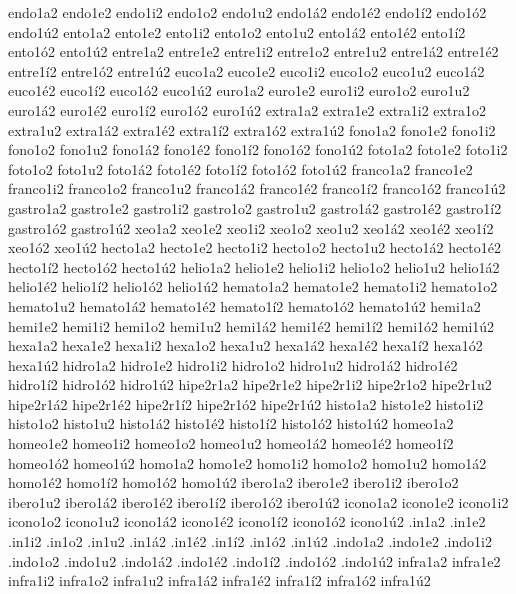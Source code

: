 {{endo1a2 endo1e2 endo1i2 endo1o2 endo1u2 endo1^^e12 endo1^^e92 endo1^^ed2 endo1^^f32 endo1^^fa2 
ento1a2 ento1e2 ento1i2 ento1o2 ento1u2 ento1^^e12 ento1^^e92 ento1^^ed2 ento1^^f32 ento1^^fa2 
entre1a2 entre1e2 entre1i2 entre1o2 entre1u2 entre1^^e12 entre1^^e92 entre1^^ed2 entre1^^f32 entre1^^fa2 
euco1a2 euco1e2 euco1i2 euco1o2 euco1u2 euco1^^e12 euco1^^e92 euco1^^ed2 euco1^^f32 euco1^^fa2 
euro1a2 euro1e2 euro1i2 euro1o2 euro1u2 euro1^^e12 euro1^^e92 euro1^^ed2 euro1^^f32 euro1^^fa2 
extra1a2 extra1e2 extra1i2 extra1o2 extra1u2 extra1^^e12 extra1^^e92 extra1^^ed2 extra1^^f32 extra1^^fa2 
fono1a2 fono1e2 fono1i2 fono1o2 fono1u2 fono1^^e12 fono1^^e92 fono1^^ed2 fono1^^f32 fono1^^fa2 
foto1a2 foto1e2 foto1i2 foto1o2 foto1u2 foto1^^e12 foto1^^e92 foto1^^ed2 foto1^^f32 foto1^^fa2 
franco1a2 franco1e2 franco1i2 franco1o2 franco1u2 franco1^^e12 franco1^^e92 franco1^^ed2 franco1^^f32 franco1^^fa2 
gastro1a2 gastro1e2 gastro1i2 gastro1o2 gastro1u2 gastro1^^e12 gastro1^^e92 gastro1^^ed2 gastro1^^f32 gastro1^^fa2 
xeo1a2 xeo1e2 xeo1i2 xeo1o2 xeo1u2 xeo1^^e12 xeo1^^e92 xeo1^^ed2 xeo1^^f32 xeo1^^fa2 
hecto1a2 hecto1e2 hecto1i2 hecto1o2 hecto1u2 hecto1^^e12 hecto1^^e92 hecto1^^ed2 hecto1^^f32 hecto1^^fa2 
helio1a2 helio1e2 helio1i2 helio1o2 helio1u2 helio1^^e12 helio1^^e92 helio1^^ed2 helio1^^f32 helio1^^fa2 
hemato1a2 hemato1e2 hemato1i2 hemato1o2 hemato1u2 hemato1^^e12 hemato1^^e92 hemato1^^ed2 hemato1^^f32 hemato1^^fa2 
hemi1a2 hemi1e2 hemi1i2 hemi1o2 hemi1u2 hemi1^^e12 hemi1^^e92 hemi1^^ed2 hemi1^^f32 hemi1^^fa2 
hexa1a2 hexa1e2 hexa1i2 hexa1o2 hexa1u2 hexa1^^e12 hexa1^^e92 hexa1^^ed2 hexa1^^f32 hexa1^^fa2 
hidro1a2 hidro1e2 hidro1i2 hidro1o2 hidro1u2 hidro1^^e12 hidro1^^e92 hidro1^^ed2 hidro1^^f32 hidro1^^fa2 
hipe2r1a2 hipe2r1e2 hipe2r1i2 hipe2r1o2 hipe2r1u2 hipe2r1^^e12 hipe2r1^^e92 hipe2r1^^ed2 hipe2r1^^f32 hipe2r1^^fa2 
histo1a2 histo1e2 histo1i2 histo1o2 histo1u2 histo1^^e12 histo1^^e92 histo1^^ed2 histo1^^f32 histo1^^fa2 
homeo1a2 homeo1e2 homeo1i2 homeo1o2 homeo1u2 homeo1^^e12 homeo1^^e92 homeo1^^ed2 homeo1^^f32 homeo1^^fa2 
homo1a2 homo1e2 homo1i2 homo1o2 homo1u2 homo1^^e12 homo1^^e92 homo1^^ed2 homo1^^f32 homo1^^fa2 
ibero1a2 ibero1e2 ibero1i2 ibero1o2 ibero1u2 ibero1^^e12 ibero1^^e92 ibero1^^ed2 ibero1^^f32 ibero1^^fa2 
icono1a2 icono1e2 icono1i2 icono1o2 icono1u2 icono1^^e12 icono1^^e92 icono1^^ed2 icono1^^f32 icono1^^fa2 
.in1a2 .in1e2 .in1i2 .in1o2 .in1u2 .in1^^e12 .in1^^e92 .in1^^ed2 .in1^^f32 .in1^^fa2 
.indo1a2 .indo1e2 .indo1i2 .indo1o2 .indo1u2 .indo1^^e12 .indo1^^e92 .indo1^^ed2 .indo1^^f32 .indo1^^fa2 
infra1a2 infra1e2 infra1i2 infra1o2 infra1u2 infra1^^e12 infra1^^e92 infra1^^ed2 infra1^^f32 infra1^^fa2 
}}
